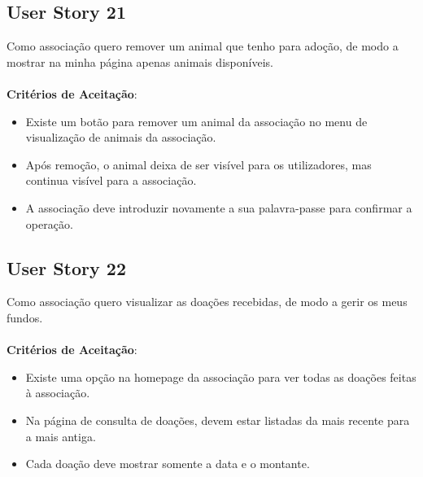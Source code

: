 \documentclass[a4paper,11pt]{article}
\begin{document}
\subsection*{User Story 21}
Como associação quero remover um animal que tenho para adoção, de modo a mostrar na minha página apenas animais disponíveis.\\\\
\textbf{Critérios de Aceitação}:
\begin{itemize}
  \item Existe um botão para remover um animal da associação no menu de visualização de animais da associação.
  \item Após remoção, o animal deixa de ser visível para os utilizadores, mas continua visível para a associação.
  \item A associação deve introduzir novamente a sua palavra-passe para confirmar a operação.
\end{itemize}

\subsection*{User Story 22}
Como associação quero visualizar as doações recebidas, de modo a gerir os meus fundos.\\\\
\textbf{Critérios de Aceitação}:
\begin{itemize}
  \item Existe uma opção na homepage da associação para ver todas as doações feitas à associação.
  \item Na página de consulta de doações, devem estar listadas da mais recente para a mais antiga.
  \item Cada doação deve mostrar somente a data e o montante.
\end{itemize}
\end{document}
